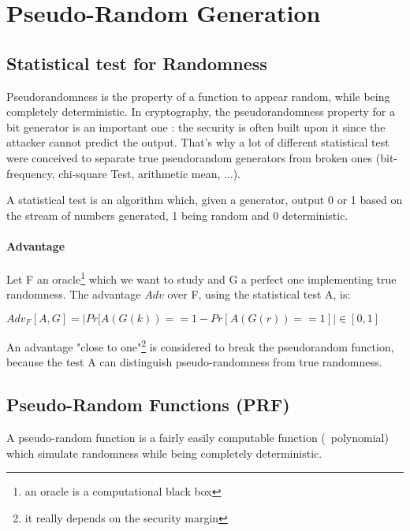 \section{ Pseudo-Random Generation }

\subsection{Statistical test for Randomness}

Pseudorandomness is the property of a function to appear random, while being completely deterministic. In cryptography, the pseudorandomness property for a bit generator is an important one : the security is often built upon it since the attacker cannot predict the output. That's why a lot of different statistical test were conceived to separate true pseudorandom generators from broken ones (bit-frequency, chi-square Test, arithmetic mean, ...).

\begin{mydef}
A statistical test is an algorithm which, given a generator, output 0 or 1 based on the stream of numbers generated, 1 being random and 0 deterministic.
\end{mydef}

\paragraph{Advantage \\}
\label{sec:advantage}

Let F an oracle\footnote{an oracle is a computational black box} which we want to study and G a perfect one implementing true randomness. The advantage $Adv$ over F, using the statistical test A, is: 
\begin{mydef}
$Adv_{F} [A,G] = | Pr[A(G(k)) == 1  - Pr[A(G(r)) == 1] | \in  [0,1] $
\end{mydef}

An advantage "close to one"\footnote{it really depends on the security margin} is considered to break the pseudorandom function, because the test A can distinguish pseudo-randomness from true randomness.


\subsection{Pseudo-Random Functions   (PRF)}

A pseudo-random function is a fairly easily computable function (~polynomial) which simulate randomness while being completely deterministic.

